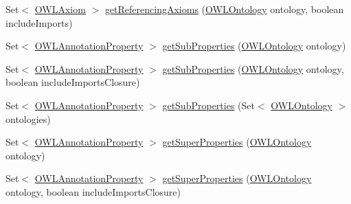 \begin{DoxyCompactItemize}
Set$<$ \hyperlink{interfaceorg_1_1semanticweb_1_1owlapi_1_1model_1_1_o_w_l_axiom}{O\-W\-L\-Axiom} $>$ \hyperlink{classuk_1_1ac_1_1manchester_1_1cs_1_1owl_1_1owlapi_1_1_o_w_l_annotation_property_impl_a329b34941f75c09e6c93d5a0897d0ec3}{get\-Referencing\-Axioms} (\hyperlink{interfaceorg_1_1semanticweb_1_1owlapi_1_1model_1_1_o_w_l_ontology}{O\-W\-L\-Ontology} ontology, boolean include\-Imports)
\item 
Set$<$ \hyperlink{interfaceorg_1_1semanticweb_1_1owlapi_1_1model_1_1_o_w_l_annotation_property}{O\-W\-L\-Annotation\-Property} $>$ \hyperlink{classuk_1_1ac_1_1manchester_1_1cs_1_1owl_1_1owlapi_1_1_o_w_l_annotation_property_impl_ab745651bbb7538beb616bd91bf1b9865}{get\-Sub\-Properties} (\hyperlink{interfaceorg_1_1semanticweb_1_1owlapi_1_1model_1_1_o_w_l_ontology}{O\-W\-L\-Ontology} ontology)
\item 
Set$<$ \hyperlink{interfaceorg_1_1semanticweb_1_1owlapi_1_1model_1_1_o_w_l_annotation_property}{O\-W\-L\-Annotation\-Property} $>$ \hyperlink{classuk_1_1ac_1_1manchester_1_1cs_1_1owl_1_1owlapi_1_1_o_w_l_annotation_property_impl_a987f4f6d51f6b8670de760267a85f571}{get\-Sub\-Properties} (\hyperlink{interfaceorg_1_1semanticweb_1_1owlapi_1_1model_1_1_o_w_l_ontology}{O\-W\-L\-Ontology} ontology, boolean include\-Imports\-Closure)
\item 
Set$<$ \hyperlink{interfaceorg_1_1semanticweb_1_1owlapi_1_1model_1_1_o_w_l_annotation_property}{O\-W\-L\-Annotation\-Property} $>$ \hyperlink{classuk_1_1ac_1_1manchester_1_1cs_1_1owl_1_1owlapi_1_1_o_w_l_annotation_property_impl_a2c0c77d57d197e906c98373d638a488b}{get\-Sub\-Properties} (Set$<$ \hyperlink{interfaceorg_1_1semanticweb_1_1owlapi_1_1model_1_1_o_w_l_ontology}{O\-W\-L\-Ontology} $>$ ontologies)
\item 
Set$<$ \hyperlink{interfaceorg_1_1semanticweb_1_1owlapi_1_1model_1_1_o_w_l_annotation_property}{O\-W\-L\-Annotation\-Property} $>$ \hyperlink{classuk_1_1ac_1_1manchester_1_1cs_1_1owl_1_1owlapi_1_1_o_w_l_annotation_property_impl_a8b0c7b4e18696e0a3223f27731268af4}{get\-Super\-Properties} (\hyperlink{interfaceorg_1_1semanticweb_1_1owlapi_1_1model_1_1_o_w_l_ontology}{O\-W\-L\-Ontology} ontology)
\item 
Set$<$ \hyperlink{interfaceorg_1_1semanticweb_1_1owlapi_1_1model_1_1_o_w_l_annotation_property}{O\-W\-L\-Annotation\-Property} $>$ \hyperlink{classuk_1_1ac_1_1manchester_1_1cs_1_1owl_1_1owlapi_1_1_o_w_l_annotation_property_impl_ac89af22bb4bb226edd45bcebb565b72a}{get\-Super\-Properties} (\hyperlink{interfaceorg_1_1semanticweb_1_1owlapi_1_1model_1_1_o_w_l_ontology}{O\-W\-L\-Ontology} ontology, boolean include\-Imports\-Closure)

\end{DoxyCompactItemize}
